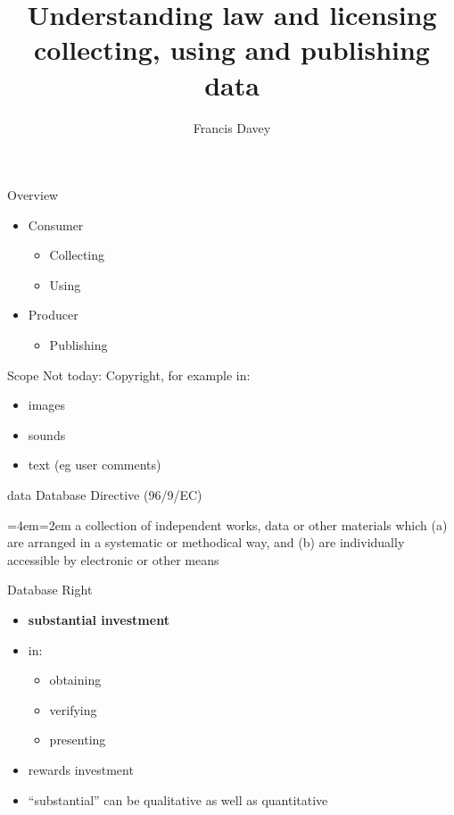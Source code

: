 \documentclass{beamer}
\title{Understanding law and licensing\\
collecting, using and publishing data}
\author{Francis Davey}
\newenvironment{blockquote}{%
  \par%
  \medskip
  \leftskip=4em\rightskip=2em%
  \noindent\ignorespaces}{%
  \par\medskip}
\begin{document}
\begin{frame}
  \titlepage
\end{frame}

\begin{frame}{Overview}
  \begin{itemize}
  \item Consumer
    \begin{itemize}
    \item Collecting
    \item Using
    \end{itemize}
  \item Producer
    \begin{itemize}
    \item Publishing
    \end{itemize}
  \end{itemize}
\end{frame}

\begin{frame}{Scope}
Not today: Copyright, for example in:
  \begin{itemize}
  \item images
  \item sounds
  \item text (eg user comments)
  \end{itemize}
  
\end{frame}

\begin{frame}{data}
  Database Directive (96/9/EC)
  \begin{blockquote}
    a collection of independent works, data or other materials which (a)
are arranged in a systematic or methodical way, and (b) are individually
accessible by electronic or other means
  \end{blockquote}
\end{frame}

\begin{frame}{Database Right}
  \begin{itemize}
  \item {\bf substantial investment}
  \item in:
    \begin{itemize}
    \item obtaining
    \item verifying
    \item presenting
    \end{itemize}
  \item rewards investment
  \item ``substantial'' can be qualitative as well as quantitative
  \end{itemize}
  
\end{frame}
\end{document}

